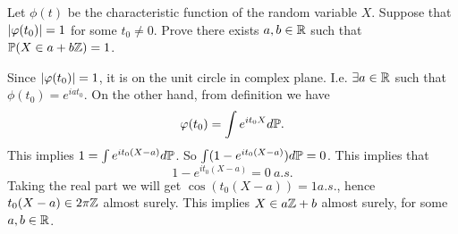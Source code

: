 \begin{problem}
	Let $ \phi(t) $ be the characteristic function of the random variable $ X $. Suppose that $ |\varphi(t_0)| = 1 $ for some $ t_0 \neq 0 $. Prove there exists $ a,b \in \mathbb{R} $ such that $ \mathbb{P}(X \in a + b\mathbb{Z}) = 1 $.
\end{problem}
\begin{solution}
	Since $ |\varphi(t_0)| = 1 $, it is on the unit circle in complex plane. I.e. $ \exists a \in \mathbb{R} $ such that $ \phi(t_0) = e^{iat_0} $. On the other hand, from definition we have
	\[ \varphi(t_0) = \int e^{it_0 X} d\mathbb{P}. \]
	This implies $ 1 = \int e^{it_0(X-a)} d\mathbb{P} $. So $ \int (1-e^{it_0(X-a)}) d\mathbb{P} = 0 $. This implies that 
	\[ 1 - e^{it_0(X-a)} = 0\ a.s. \]
	Taking the real part we will get $ \cos(t_0(X-a)) = 1 a.s. $, hence $ t_0(X-a)\in 2\pi\mathbb{Z} $ almost surely. This implies $ X \in a\mathbb{Z} + b $ almost surely, for some $ a,b \in \mathbb{R} $.
	\[  \]
\end{solution}





